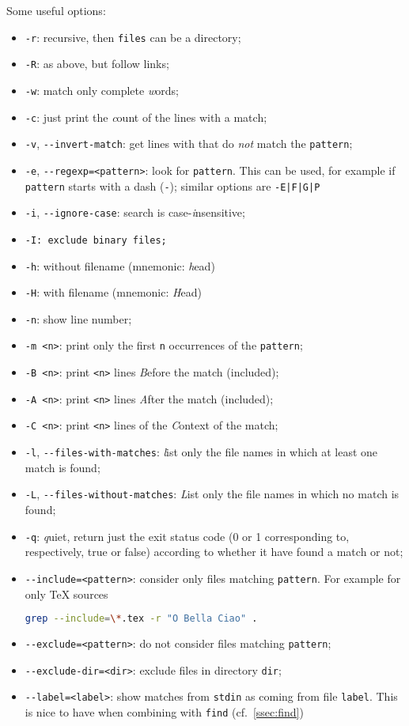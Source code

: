 \documentclass[a4paper,12pt,%
              final%
              ]{article}
\begin{document}
Some useful options:
\begin{itemize}
  \item \texttt{-r}: recursive, then \texttt{files} can be a directory;
  \item \texttt{-R}: as above, but follow links;
  \item \texttt{-w}: match only complete \emph{w}ords;
  \item \texttt{-c}: just print the \emph{c}ount of the lines with a match;
  \item \texttt{-v}, \verb|--invert-match|: get lines with that do \emph{not} match the \texttt{pattern};
  \item \texttt{-e}, \verb|--regexp=<pattern>|: look for \texttt{pattern}. This can be used, for example if \texttt{pattern} starts with a dash (\texttt{-}); similar options are \verb!-E|F|G|P!
  \item \texttt{-i}, \verb|--ignore-case|: search is case-\emph{i}nsensitive;
  \item \texttt{-I: exclude binary files;}
  \item \texttt{-h}: without filename (mnemonic: \emph{h}ead)
  \item \texttt{-H}: with filename (mnemonic: \emph{H}ead)
  \item \texttt{-n}: show line number;
  \item \texttt{-m <n>}: print only the first \texttt{n} occurrences of the \texttt{pattern};
  \item \texttt{-B <n>}: print \texttt{<n>} lines \emph{B}efore the match (included);
  \item \texttt{-A <n>}: print \texttt{<n>} lines \emph{A}fter the match (included);
  \item \texttt{-C <n>}: print \texttt{<n>} lines of the \emph{C}ontext of the match;
  \item \texttt{-l}, \verb|--files-with-matches|: \emph{l}ist only the file names in which at least one match is found;
  \item \texttt{-L}, \verb|--files-without-matches|: \emph{L}ist only the file names in which no match is found;
  \item \texttt{-q}: \emph{q}uiet, return just the exit status code (0 or 1 corresponding to, respectively, true or false) according to whether it have found a match or not;
  \item \verb|--include=<pattern>|: consider only files matching \texttt{pattern}. For example for only \TeX{} sources
\begin{lstlisting}[language=bash]
grep --include=\*.tex -r "O Bella Ciao" .
\end{lstlisting}
  \item \verb|--exclude=<pattern>|: do not consider files matching \texttt{pattern};
  \item \verb|--exclude-dir=<dir>|: exclude files in directory \texttt{dir};
  \item \verb|--label=<label>|: show matches from \texttt{stdin} as coming from file \texttt{label}. This is nice to have when combining with \texttt{find} (cf.\ \autoref{ssec:find})
\end{itemize}
\end{document}
